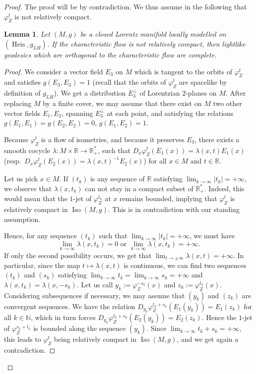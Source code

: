 \documentclass[11pt]{article}
\newtheorem{lemm}[theo]{Lemma}
\theoremstyle{definition}
\numberwithin{equation}{section}
\numberwithin{figure}{section}
\numberwithin{table}{section}
\DeclareMathOperator{\Iso}{Iso}
\DeclareMathOperator{\Heis}{Heis}
\newcommand*\NN{\mathbb{N}}
\newcommand*\RR{\mathbb{R}}
\begin{document}
\begin{proof}
The proof will be by contradiction. We thus assume in the following that ${\varphi}_Z^t$ is not relatively compact.

\begin{lemm}\label{lem.lightlike.complete}
Let $(M,g)$ be a closed Lorentz manifold locally modelled on $(\Heis,g_{LH})$. If the characteristic flow is not relatively compact, then lightlike geodesics which are orthogonal to the characteristic flow are complete.
\end{lemm}

\begin{proof}
We consider a vector field $E_3$ on $M$ which is tangent to the orbits of ${\varphi}_Z^t$ and satisfies $g(E_3,E_3)=1$ (recall that the orbits of ${\varphi}_Z^t$ are spacelike by definition of $g_{LH}$). We get a distribution $E_3^{\perp}$ of Lorentzian $2$-planes on $M$. After replacing $M$ by a finite cover, we may assume that there exist on $M$ two other vector fields $E_1,E_2$, spanning $E_3^{\perp}$ at each point, and satisfying the relations $g(E_1,E_1)=g(E_2,E_2)=0$, $g(E_1,E_2)=1$.

Because ${\varphi}_Z^t$ is a flow of isometries, and because it preserves $E_3$, there exists a smooth cocycle $\lambda: M \times \RR \to \RR_+^*$, such that $D_{x}\varphi_Z^{t}(E_1(x))= \lambda(x,t) E_1(x)$ (resp.~$D_{x}\varphi_Z^{t}(E_2(x))= \lambda(x,t)^{-1} E_2(x)$) for all $x \in M$ and $t \in \RR$.

Let us pick $x \in M$. If $(t_k)$ is any sequence of $\RR$ satisfying $\lim_{k \to \infty}|t_k|=+\infty$, we observe that $\lambda(x,t_k)$ can not stay in a compact subset of $\RR_+^*$. Indeed, this would mean that the $1$-jet of $\varphi_Z^{t_k}$ at $x$ remains bounded, implying that ${\varphi}_Z^t$ is relatively compact in $\Iso(M,g)$. This is in contradiction with our standing assumption.

Hence, for any sequence $(t_k)$ such that $\lim_{k \to \infty}|t_k|=+\infty$, we must have
\[
\lim_{k \to \infty}\lambda(x,t_k)=0 \text{ or } \lim_{k \to \infty}\lambda(x,t_k)=+ \infty.
\]
If only the second possibility occurs, we get that $\lim_{t \to \pm \infty} \lambda(x,t)= + \infty$. In particular, since the map $t \mapsto \lambda(x,t)$ is continuous, we can find two sequences $(t_k)$ and $(s_k)$ satisfying $\lim_{k \to \infty} t_k =\lim_{k \to \infty} s_k =+ \infty$ and $\lambda(x,t_k)=\lambda(x, -s_k)$. Let us call $y_k:={\varphi}_Z^{-s_k}(x)$ and $z_k:={\varphi}_Z^{t_k}(x)$. Considering subsequences if necessary, we may assume that $(y_k)$ and $(z_k)$ are convergent sequences. We have the relation $D_{y_k}{\varphi}_Z^{t_k+s_k}(E_1(y_k))=E_1(z_k)$ for all $k \in \NN$, which in turn forces $D_{y_k}{\varphi}_Z^{t_k+s_k}(E_2(y_k))=E_2(z_k)$. Hence the $1$-jet of $\varphi_Z^{s_k+t_k}$ is bounded along the sequence $(y_k)$. Since $\lim_{k \to \infty} t_k+s_k=+ \infty$, this leads to ${\varphi}_Z^t$ being relatively compact in $\Iso(M,g)$, and we get again a contradiction.


\end{proof}
\end{proof}
\end{document}
